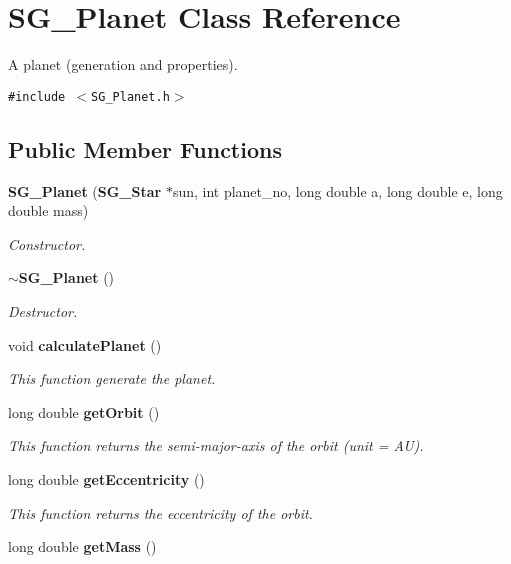 \section{SG\_\-Planet Class Reference}
\label{class_s_g___planet}
A planet (generation and properties).  


{\tt \#include $<$SG\_\-Planet.h$>$}

\subsection*{Public Member Functions}
\begin{CompactItemize}
\item 
{\bf SG\_\-Planet} ({\bf SG\_\-Star} $\ast$sun, int planet\_\-no, long double a, long double e, long double mass)\label{class_s_g___planet_a0}

\begin{CompactList}\small\item\em Constructor. \item\end{CompactList}\item 
{\bf $\sim$SG\_\-Planet} ()\label{class_s_g___planet_a1}

\begin{CompactList}\small\item\em Destructor. \item\end{CompactList}\item 
void {\bf calculate\-Planet} ()\label{class_s_g___planet_a2}

\begin{CompactList}\small\item\em This function generate the planet. \item\end{CompactList}\item 
long double {\bf get\-Orbit} ()\label{class_s_g___planet_a3}

\begin{CompactList}\small\item\em This function returns the semi-major-axis of the orbit (unit = AU). \item\end{CompactList}\item 
long double {\bf get\-Eccentricity} ()\label{class_s_g___planet_a4}

\begin{CompactList}\small\item\em This function returns the eccentricity of the orbit. \item\end{CompactList}\item 
long double {\bf get\-Mass} ()\label{class_s_g___planet_a5}


\end{CompactItemize}
